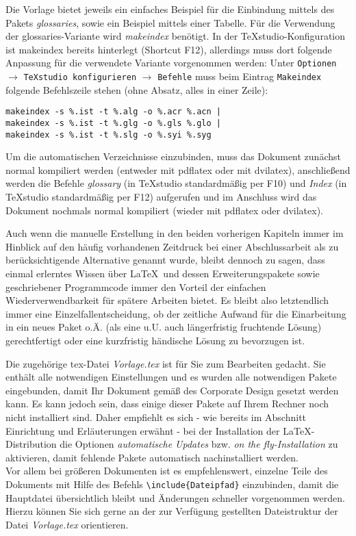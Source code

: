 Die Vorlage bietet jeweils ein einfaches Beispiel für die Einbindung mittels des Pakets \emph{glossaries}, sowie ein Beispiel mittels einer Tabelle. Für die Verwendung der glossaries-Variante wird \textit{makeindex} benötigt. In der TeXstudio-Konfiguration ist makeindex bereits hinterlegt (Shortcut F12), allerdings muss dort folgende Anpassung für die verwendete Variante vorgenommen werden:\newline
Unter \verb|Optionen| $\rightarrow$ \verb|TeXstudio konfigurieren| $\rightarrow$ \verb|Befehle| muss beim Eintrag \verb|Makeindex| folgende Befehlszeile stehen (ohne Absatz, alles in einer Zeile): 
\begin{verbatim}
makeindex -s %.ist -t %.alg -o %.acr %.acn | 
makeindex -s %.ist -t %.glg -o %.gls %.glo | 
makeindex -s %.ist -t %.slg -o %.syi %.syg
\end{verbatim}

Um die automatischen Verzeichnisse einzubinden, muss das Dokument zunächst normal kompiliert werden (entweder mit pdflatex oder mit dvilatex), anschließend werden die Befehle \emph{glossary} (in TeXstudio standardmäßig per F10) und \emph{Index} (in TeXstudio standardmäßig per F12) aufgerufen und im Anschluss wird das Dokument nochmals normal kompiliert (wieder mit pdflatex oder dvilatex).

Auch wenn die manuelle Erstellung in den beiden vorherigen Kapiteln immer im Hinblick auf den häufig vorhandenen Zeitdruck bei einer Abschlussarbeit als zu berücksichtigende Alternative genannt wurde, bleibt dennoch zu sagen, dass einmal erlerntes Wissen über \LaTeX\ und dessen Erweiterungspakete sowie geschriebener Programmcode immer den Vorteil der einfachen Wiederverwendbarkeit für spätere Arbeiten bietet. Es bleibt also letztendlich immer eine Einzelfallentscheidung, ob der zeitliche Aufwand für die Einarbeitung in ein neues Paket o.Ä. (als eine u.U. auch längerfristig fruchtende Lösung) gerechtfertigt oder eine kurzfristig händische Lösung zu bevorzugen ist.

Die zugehörige tex-Datei \emph{Vorlage.tex} ist für Sie zum Bearbeiten gedacht. Sie enthält alle notwendigen Einstellungen und es wurden alle notwendigen Pakete eingebunden, damit Ihr Dokument gemäß des Corporate Design gesetzt werden kann. Es kann jedoch sein, dass einige dieser Pakete auf Ihrem Rechner noch nicht installiert sind. Daher empfiehlt es sich - wie bereits im Abschnitt Einrichtung und Erläuterungen erwähnt - bei der Installation der \LaTeX-Distribution die Optionen \emph{automatische Updates} bzw. \emph{on the fly-Installation} zu aktivieren, damit fehlende Pakete automatisch nachinstalliert werden.\\
Vor allem bei größeren Dokumenten ist es empfehlenswert, einzelne Teile des Dokuments mit Hilfe des Befehls \texttt{\textbackslash include\{Dateipfad\}} einzubinden, damit die Hauptdatei übersichtlich bleibt und Änderungen schneller vorgenommen werden. Hierzu können Sie sich gerne an der zur Verfügung gestellten Dateistruktur der Datei \emph{Vorlage.tex} orientieren.